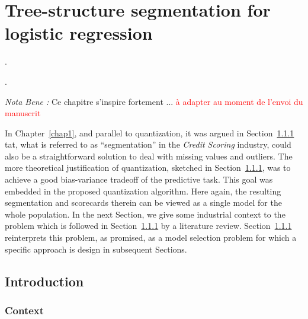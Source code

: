 \chapter{Tree-structure segmentation for logistic regression} \label{chap6}

\epigraph{.}{.}

\minitoc


\textit{Nota Bene :} Ce chapitre s'inspire fortement ... \textcolor{red}{à adapter au moment de l'envoi du manuscrit}

\bigskip


In Chapter~\ref{chap1}, and parallel to quantization, it was argued in Section~\ref{} tat, what is referred to as ``segmentation'' in the \textit{Credit Scoring} industry, could also be a straightforward solution to deal with missing values and outliers. The more theoretical justification of quantization, sketched in Section~\ref{}, was to achieve a good bias-variance tradeoff of the predictive task. This goal was embedded in the proposed quantization algorithm. Here again, the resulting segmentation and scorecards therein can be viewed as a single model for the whole population. In the next Section, we give some industrial context to the problem which is followed in Section~\ref{} by a literature review. Section~\ref{} reinterprets this problem, as promised, as a model selection problem for which a specific approach is design in subsequent Sections.


\section{Introduction}

\subsection{Context}

